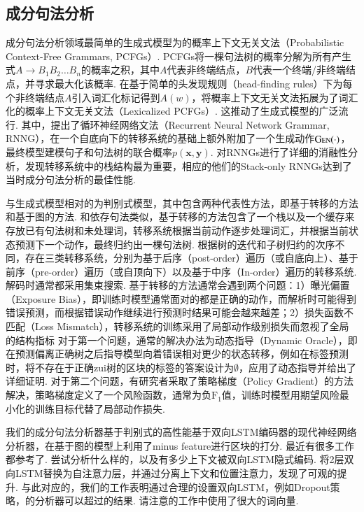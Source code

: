 \subsection{成分句法分析}

成分句法分析领域最简单的生成式模型为的概率上下文无关文法（Probabilistic Context-Free Grammars, PCFGs）.
PCFGs将一棵句法树的概率分解为所有产生式$A\rightarrow B_1B_2\dots B_n$的概率之积，其中$A$代表非终端结点，$B$代表一个终端/非终端结点，并寻求最大化该概率.
\citet{collins-1997-three}在基于简单的头发现规则（head-finding rules）下为每个非终端结点$A$引入词汇化标记得到$A(w)$，将概率上下文无关文法拓展为了词汇化的概率上下文无关文法（Lexicalized PCFGs）.
这推动了生成式模型的广泛流行.
其中，\citet{dyer-etal-2016-recurrent}提出了循环神经网络文法（Recurrent Neural Network Grammar, RNNG），在一个自底向下的转移系统的基础上额外附加了一个生成动作$\textsc{Gen}(\cdot)$，最终模型建模句子和句法树的联合概率$p(\boldsymbol{x},\boldsymbol{y})$.
\citet{kuncoro-etal-2017-recurrent}对RNNGs进行了详细的消融性分析，发现转移系统中的栈结构最为重要，相应的他们的Stack-only RNNGs达到了当时成分句法分析的最佳性能.

与生成式模型相对的为判别式模型，其中包含两种代表性方法，即基于转移的方法和基于图的方法.
和依存句法类似，基于转移的方法包含了一个栈以及一个缓存来存放已有句法树和未处理词，转移系统根据当前动作逐步处理词汇，并根据当前状态预测下一个动作，最终归约出一棵句法树.
根据树的迭代和子树归约的次序不同，存在三类转移系统，分别为基于后序（post-order）遍历（或自底向上）、基于前序（pre-order）遍历（或自顶向下）以及基于中序（In-order）遍历\citet{liu-zhang-2017-order}的转移系统.
解码时通常都采用集束搜索.
基于转移的方法通常会遇到两个问题：1）曝光偏置（Exposure Bias），即训练时模型通常面对的都是正确的动作，而解析时可能得到错误预测，而根据错误动作继续进行预测时结果可能会越来越差；2）损失函数不匹配（Loss Mismatch），转移系统的训练采用了局部动作级别损失而忽视了全局的结构指标
对于第一个问题，通常的解决办法为动态指导（Dynamic Oracle），即在预测偏离正确树之后指导模型向着错误相对更少的状态转移，例如在标签预测时，将不存在于正确zui树的区块的标签的答案设计为$\emptyset$，\citet{cross-huang-2016-span}应用了动态指导并给出了详细证明.
对于第二个问题，有研究者\citep{fried-klein-2018-policy}采取了策略梯度（Policy Gradient）的方法解决，策略梯度定义了一个风险函数，通常为负$\mathrm{F}_1$值，训练时模型用期望风险最小化的训练目标代替了局部动作损失.

我们的成分句法分析器基于判别式的高性能基于双向LSTM编码器的现代神经网络分析器\citep{stern-etal-2017-minimal}，在基于图的模型上利用了minus feature\citep{cross-huang-2016-span}进行区块的打分.
最近有很多工作都参考了\citet{stern-etal-2017-minimal}.
\citet{gaddy-etal-2018-whats}尝试分析什么样的，以及有多少上下文被双向LSTM隐式编码.
\citet{kitaev-klein-2018-constituency}将2层双向LSTM替换为自注意力层，并通过分离上下文和位置注意力，发现了可观的提升.
与此对应的，我们的工作表明通过合理的设置双向LSTM，例如Dropout策略，\citet{stern-etal-2017-minimal}的分析器可以超过\citet{kitaev-klein-2018-constituency}的结果.
请注意\citet{kitaev-klein-2018-constituency}的工作中使用了很大的词向量.

